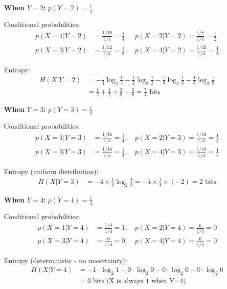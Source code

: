 \documentclass[11pt,a4paper]{book}
\newcounter{qna}[chapter]
\renewcommand{\theqna}{\thechapter.\arabic{qna}}
\newenvironment{questionanswerbox}{
    \refstepcounter{qna}%
    \begin{tcolorbox}[
        enhanced,
        breakable,
        colback=softlavender!10,
        colframe=softlavender!200,
        title={Example~\theqna}, %
        fonttitle=\bfseries,
        coltitle=white,
        colbacktitle=softlavender!200,
        sharp corners,
        boxrule=1pt,
        left=8pt,
        right=8pt,
        top=6pt,
        bottom=6pt
    ]
}{
    \end{tcolorbox}
}
\begin{document}
\begin{questionanswerbox}
    \hrulefill

    \textbf{When \(Y=2\):} \(p(Y=2) = \frac{1}{4}\)

    Conditional probabilities:
    \begin{align*}
        p(X=1|Y=2) & = \frac{1/16}{1/4} = \frac{1}{4}, \quad
        p(X=2|Y=2) = \frac{1/8}{1/4} = \frac{1}{2}           \\
        p(X=3|Y=2) & = \frac{1/32}{1/4} = \frac{1}{8}, \quad
        p(X=4|Y=2) = \frac{1/32}{1/4} = \frac{1}{8}
    \end{align*}

    Entropy:
    \begin{align*}
        H(X|Y=2) & = -\frac{1}{4}\log_2\frac{1}{4} - \frac{1}{2}\log_2\frac{1}{2} - \frac{1}{8}\log_2\frac{1}{8} - \frac{1}{8}\log_2\frac{1}{8} \\
                 & = \frac{1}{2} + \frac{1}{2} + \frac{3}{8} + \frac{3}{8} = \frac{7}{4} \text{ bits}
    \end{align*}

    \hrulefill

    \textbf{When \(Y=3\):} \(p(Y=3) = \frac{1}{4}\)

    Conditional probabilities:
    \begin{align*}
        p(X=1|Y=3) & = \frac{1/16}{1/4} = \frac{1}{4}, \quad
        p(X=2|Y=3) = \frac{1/16}{1/4} = \frac{1}{4}          \\
        p(X=3|Y=3) & = \frac{1/16}{1/4} = \frac{1}{4}, \quad
        p(X=4|Y=3) = \frac{1/16}{1/4} = \frac{1}{4}
    \end{align*}

    Entropy (uniform distribution):
    \begin{align*}
        H(X|Y=3) & = -4 \times \frac{1}{4}\log_2\frac{1}{4} = -4 \times \frac{1}{4} \times (-2) = 2 \text{ bits}
    \end{align*}

    \hrulefill

    \textbf{When \(Y=4\):} \(p(Y=4) = \frac{1}{4}\)

    Conditional probabilities:
    \begin{align*}
        p(X=1|Y=4) & = \frac{1/4}{1/4} = 1, \quad
        p(X=2|Y=4) = \frac{0}{1/4} = 0            \\
        p(X=3|Y=4) & = \frac{0}{1/4} = 0, \quad
        p(X=4|Y=4) = \frac{0}{1/4} = 0
    \end{align*}

    Entropy (deterministic - no uncertainty):
    \begin{align*}
        H(X|Y=4) & = -1 \cdot \log_2 1 - 0 \cdot \log_2 0 - 0 \cdot \log_2 0 - 0 \cdot \log_2 0 \\
                 & = 0 \text{ bits (X is always 1 when Y=4)}
    \end{align*}


\end{questionanswerbox}
\end{document}
